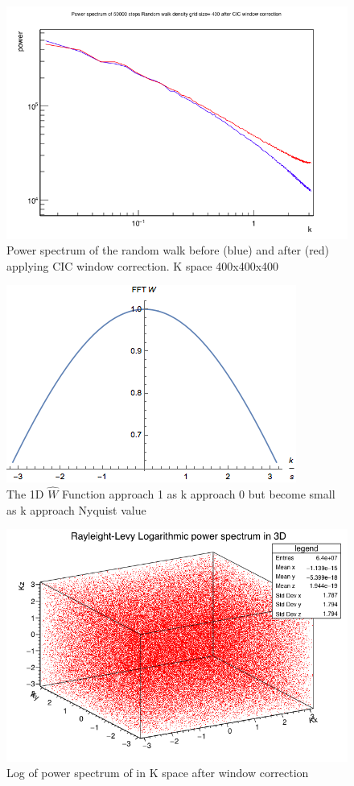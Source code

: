 \begin{figure}[!htbp]
  \centering

  \includegraphics[width=1\linewidth]{finalofall}
  \caption{Power spectrum of the random walk before (blue) and after (red) applying CIC window correction. K space 400x400x400}
  \label{cic}
\end{figure}
  
\begin{figure}[!htbp]

    \centering
  \includegraphics[width=0.4\linewidth]{Window}
  \caption{The 1D $\hat{W}$ Function approach 1 as k approach 0 but become small as k approach Nyquist value}
  \label{win}

\end{figure}
\FloatBarrier



\begin{figure}[!htbp]
  \centering
  \includegraphics[width=1\linewidth]{3D_555_log}
  \caption{Log of power spectrum of in K space after window correction}
  \label{fig:test2}
\end{figure}
\FloatBarrier

